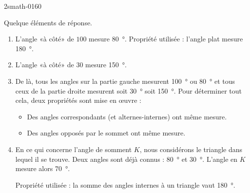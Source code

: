 
\begin{corrige}{2smath-0160}

    Quelque éléments de réponse.
    \begin{enumerate}
        \item
            L'angle «à côté» de \( 100\) mesure \SI{80}{\degree}. Propriété utilisée : l'angle plat mesure \SI{180}{\degree}.
        \item
            L'angle «à côté» de \( 30\) mesure \SI{150}{\degree}.
        \item
            De là, tous les angles sur la partie gauche mesurent \SI{100}{\degree} ou \SI{80}{\degree} et tous ceux de la partie droite mesurent soit \SI{30}{\degree} soit \SI{150}{\degree}. Pour déterminer tout cela, deux propriétés sont mise en œuvre :
            \begin{itemize}
                \item Des angles correspondants (et alternes-internes) ont même mesure.
                \item Des angles opposés par le sommet ont même mesure.
            \end{itemize}
        \item
            En ce qui concerne l'angle de somment \( K\), nous considérons le triangle dans lequel il se trouve. Deux angles sont déjà connus : \SI{80}{\degree} et \SI{30}{\degree}. L'angle en \( K\) mesure alors \SI{70}{\degree}.

            Propriété utilisée : la somme des angles internes à un triangle vaut \SI{180}{\degree}.
    \end{enumerate}
    
\end{corrige}
